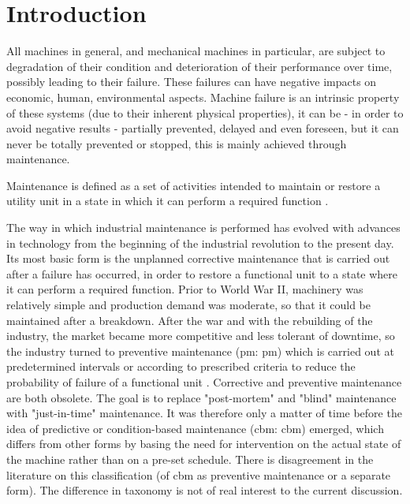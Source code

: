 \chapter*{Introduction}

All machines in general, and mechanical machines in particular, are subject to degradation of their condition and deterioration of their performance over time, possibly leading to their failure. These failures can have negative impacts on economic, human, environmental aspects.
Machine failure is an intrinsic property of these systems (due to their inherent physical properties), it can be - in order to avoid negative results - partially prevented, delayed and even foreseen, but it can never be totally prevented or stopped, this is mainly achieved through maintenance.

Maintenance is defined as a set of activities intended to maintain or restore a utility unit in a state in which it can perform a required function \cite{ISO2015}.

The way in which industrial maintenance is performed has evolved with advances in technology from the beginning of the industrial revolution to the present day. Its most basic form is the unplanned corrective maintenance that is carried out after a failure has occurred, in order to restore a functional unit to a state where it can perform a required function\cite{ISO2015}. Prior to World War II, machinery was relatively simple and production demand was moderate, so that it could be maintained after a breakdown. After the war and with the rebuilding of the industry, the market became more competitive and less tolerant of downtime, so the industry turned to preventive maintenance (\acrlong{pm}: \acrshort{pm}) which is carried out at predetermined intervals or according to prescribed criteria to reduce the probability of failure of a functional unit \cite{ISO2015}. Corrective and preventive maintenance are both obsolete. The goal is to replace "post-mortem" and "blind" maintenance with "just-in-time" maintenance. 
It was therefore only a matter of time before the idea of predictive or condition-based maintenance (\acrlong{cbm}: \acrshort{cbm}) emerged, which differs from other forms by basing the need for intervention on the actual state of the machine rather than on a pre-set schedule\cite{Kadry2013}. There is disagreement in the literature on this classification (of \acrshort{cbm} as preventive maintenance or a separate form)\cite{Shin2015}. The difference in taxonomy is not of real interest to the current discussion.

